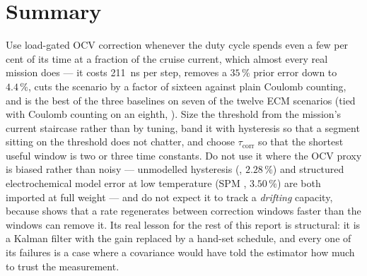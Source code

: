 \section{Summary}
Use load-gated OCV correction whenever the duty cycle spends even a few per cent of its time at a
fraction of the cruise current, which almost every real mission does --- it costs
\SI{211}{\nano\second} per step, removes a $35\,\%$ prior error down to $4.4\,\%$, cuts the
 scenario by a factor of sixteen against plain Coulomb counting, and is the best of
the three baselines on seven of the twelve ECM scenarios (tied with Coulomb counting on an
eighth, ). Size the threshold from the mission's current
staircase rather than by tuning, band it with hysteresis so that a segment sitting on the threshold
does not chatter, and choose $\tau_{\text{corr}}$ so that the shortest useful window is two or three
time constants. Do not use it where the OCV proxy is biased rather than noisy --- unmodelled
hysteresis (, $2.28\,\%$) and structured electrochemical model error at low
temperature (SPM , $3.50\,\%$) are both imported at full weight --- and do not expect it
to track a \emph{drifting} capacity, because  shows that a rate regenerates between
correction windows faster than the windows can remove it. Its real lesson for the rest of this
report is structural: it is a Kalman filter with the gain replaced by a hand-set schedule, and every
one of its failures is a case where a covariance would have told the estimator how much to trust the
measurement.
